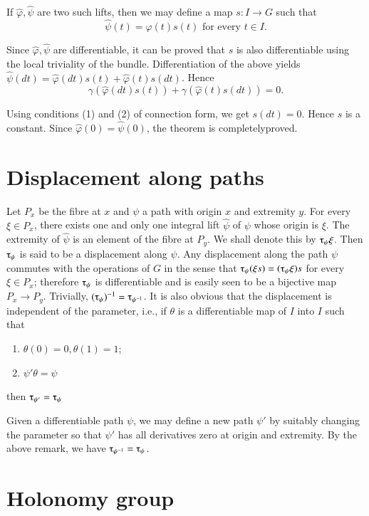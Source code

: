 If $\hat{\varphi},\hat{\psi}$ are two such lifts, then we may define a
map $s : I \rightarrow G$ such that  
$$
\hat{\psi}(t) = \hat{\varphi}(t)s(t) \text{ for every } t \in I.
$$

Since $\hat{\varphi},\hat{\psi}$ are differentiable, it can be proved
that $s$ is also differentiable using the local triviality of the
bundle. Differentiation of the above yields $\hat{\psi} (dt) =
\hat{\varphi}(dt) s(t) + \hat{\varphi}(t) s(dt)$. Hence 
$$
\gamma(\hat{\varphi}(dt)s(t)) + \gamma (\hat{\varphi}(t) s(dt)) = 0.
$$

Using conditions (1) and (2) of connection form, we get $s(dt) =
0$. Hence $s$ is a constant. Since $\hat{\varphi}(0) = \hat{\psi}(0)$,
the theorem is completely\pageoriginale proved. 

\section{Displacement along paths}\label{chap4:sec2}%

Let $P_x$ be the fibre at $x$ and $\psi$ a path with origin $x$ and
extremity $y$. For every $\xi \in P_x$, there exists one and only one
integral lift $\hat{\psi}$ of $\psi$ whose origin is $\xi$. The
extremity of $\hat{\psi}$ is an element of the fibre at $P_y$. We
shall denote this by $\tauup_\psi \xi$. Then $\tauup_\psi$ is said to
be a displacement along $\psi$. Any displacement along the path $\psi$
commutes with the operations of $G$ in the sense that $\tauup_\psi
(\xi s) = (\tauup_\psi \xi) s$ for every $\xi \in P_x$; therefore
$\tauup_\psi$ is differentiable and is easily seen to be a bijective
map  $P_x \rightarrow P_y$. Trivially, $(\tauup_\psi)^{-1} =
\tauup_{\psi^{-1}}$. It is also obvious that the displacement is
independent of the parameter, i.e., if $\theta$ is a differentiable
map of $I$ into $I$ such that  
\begin{enumerate}[1)]
\item $\theta (0) = 0, \theta(1) = 1$;
\item $\psi' \theta = \psi$
\end{enumerate}
then $\tauup_{\psi'} = \tauup_\psi$

Given a differentiable path $\psi$, we may define a new path $\psi'$
by suitably changing the parameter so that $\psi'$ has all derivatives
zero at origin and extremity. By the above remark, we have
$\tauup_{\psi^{-1}} = \tauup_\psi$. 

\section{Holonomy group}\label{chap4:sec3}%


